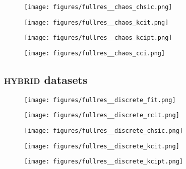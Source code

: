 \begin{figure}[!h]
\texttt{[image: figures/fullres\_\_chaos\_chsic.png]}
\caption{}
\label{fig:result_chaos_chsic}
\end{figure}

\begin{figure}[!h]
\texttt{[image: figures/fullres\_\_chaos\_kcit.png]}
\caption{}
\label{fig:result_chaos_kcit}
\end{figure}

\begin{figure}[!h]
\texttt{[image: figures/fullres\_\_chaos\_kcipt.png]}
\caption{}
\label{fig:result_chaos_kcipt}
\end{figure}

\begin{figure}[!h]
\texttt{[image: figures/fullres\_\_chaos\_cci.png]}
\caption{}
\label{fig:result_chaos_cci}
\end{figure}

\FloatBarrier
\subsection{\textsc{hybrid} datasets}

\begin{figure}[!h]
\texttt{[image: figures/fullres\_\_discrete\_fit.png]}
\caption{}
\label{fig:result_discrete_fit}
\end{figure}

\begin{figure}[!h]
\texttt{[image: figures/fullres\_\_discrete\_rcit.png]}
\caption{}
\label{fig:result_discrete_rcit}
\end{figure}

\begin{figure}[!h]
\texttt{[image: figures/fullres\_\_discrete\_chsic.png]}
\caption{}
\label{fig:result_discrete_chsic}
\end{figure}

\begin{figure}[!h]
\texttt{[image: figures/fullres\_\_discrete\_kcit.png]}
\caption{}
\label{fig:result_discrete_kcit}
\end{figure}

\begin{figure}[!h]
\texttt{[image: figures/fullres\_\_discrete\_kcipt.png]}
\caption{}
\label{fig:result_discrete_kcipt}
\end{figure}

